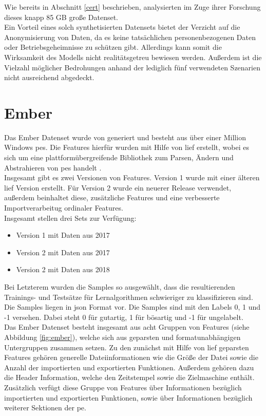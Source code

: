 \documentclass[
    12pt, %
    DIV10,
    ngerman, %
    a4paper, %
    oneside, %
    titlepage, %
    parskip=half, %
    headings=normal, %
    listof=totoc, %
    bibliography=totoc, %
    index=totoc, %
    captions=tableheading, %
    final %
]{scrreprt}
\begin{document}
Wie bereits in Abschnitt \ref{cert} beschrieben, analysierten \textcite{Le2019} im Zuge ihrer Forschung dieses knapp 85 GB gro{\ss}e Datenset.\\
Ein Vorteil eines solch synthetisierten Datensets bietet der Verzicht auf die Anonymisierung von Daten, da es keine tatsächlichen personenbezogenen Daten oder Betriebsgeheimnisse zu schützen gibt. Allerdings kann somit die Wirksamkeit des Modells nicht realitätsgetreu bewiesen werden. Au{\ss}erdem ist die Vielzahl möglicher Bedrohungen anhand der lediglich fünf verwendeten Szenarien nicht ausreichend abgedeckt.
\section{Ember}\label{sec:ember}
Das Ember Datenset wurde von \textcite{anderson2018ember} generiert und besteht aus über einer Million Windows \ac{pes}. Die Features hierfür wurden mit Hilfe von \ac{lief} erstellt, wobei es sich um eine plattformübergreifende Bibliothek zum Parsen, Ändern und Abstrahieren von \ac{pes} handelt \parencite{Quarkslab}.\\
Insgesamt gibt es zwei Versionen von Features. Version 1 wurde mit einer älteren \ac{lief} Version erstellt. Für Version 2 wurde ein neuerer Release verwendet, au{\ss}erdem beinhaltet diese, zusätzliche Features und eine verbesserte Importverarbeitug ordinaler Features.\\
Insgesamt stellen \textcite{anderson2018ember} drei Sets zur Verfügung:
\begin{itemize}
\item Version 1 mit Daten aus 2017
\item Version 2 mit Daten aus 2017
\item Version 2 mit Daten aus 2018
\end{itemize}
Bei Letzterem wurden die Samples so ausgewählt, dass die resultierenden Trainings- und Testsätze für Lernalgorithmen schwieriger zu klassifizieren sind.\\
Die Samples liegen in \ac{json} Format vor. Die Samples sind mit den Labels 0, 1 und -1 versehen. Dabei steht 0 für gutartig, 1 für bösartig und -1 für ungelabelt.\\
Das Ember Datenset besteht insgesamt aus acht Gruppen von Features (siehe Abbildung \ref{fig:ember}), welche sich aus geparsten und formatunabhängigen Untergruppen zusammen setzen. Zu den zunächst mit Hilfe von \ac{lief} geparsten Features gehören generelle Dateiinformationen wie die Grö{\ss}e der Datei sowie die Anzahl der importierten und exportierten Funktionen. Au{\ss}erdem gehören dazu die Header Information, welche den Zeitstempel sowie die Zielmaschine enthält. Zusätzlich verfügt diese Gruppe von Features über Informationen bezüglich importierten und exportierten Funktionen, sowie über Informationen bezüglich weiterer Sektionen der \ac{pe}.
\end{document}

